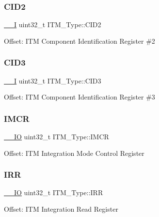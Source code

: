 \subsubsection{\texorpdfstring{CID2}{CID2}}
{\footnotesize\ttfamily \mbox{\hyperlink{group___c_m_s_i_s___c_m3__core__definitions_gaf63697ed9952cc71e1225efe205f6cd3}{\+\_\+\+\_\+I}} uint32\+\_\+t I\+T\+M\+\_\+\+Type\+::\+C\+I\+D2}

Offset\+: I\+TM Component Identification Register \#2 \mbox{\label{struct_i_t_m___type_a0e7aa199619cc7ac6baddff9600aa52e}} 
\subsubsection{\texorpdfstring{CID3}{CID3}}
{\footnotesize\ttfamily \mbox{\hyperlink{group___c_m_s_i_s___c_m3__core__definitions_gaf63697ed9952cc71e1225efe205f6cd3}{\+\_\+\+\_\+I}} uint32\+\_\+t I\+T\+M\+\_\+\+Type\+::\+C\+I\+D3}

Offset\+: I\+TM Component Identification Register \#3 \mbox{\label{struct_i_t_m___type_ab2e87d8bb0e3ce9b8e0e4a6a6695228a}} 
\subsubsection{\texorpdfstring{IMCR}{IMCR}}
{\footnotesize\ttfamily \mbox{\hyperlink{group___c_m_s_i_s___c_m3__core__definitions_gaec43007d9998a0a0e01faede4133d6be}{\+\_\+\+\_\+\+IO}} uint32\+\_\+t I\+T\+M\+\_\+\+Type\+::\+I\+M\+CR}

Offset\+: I\+TM Integration Mode Control Register ~\newline
 \mbox{\label{struct_i_t_m___type_ae43a66174b8ab182ff595e5f5da9f235}} 
\subsubsection{\texorpdfstring{IRR}{IRR}}
{\footnotesize\ttfamily \mbox{\hyperlink{group___c_m_s_i_s___c_m3__core__definitions_gaec43007d9998a0a0e01faede4133d6be}{\+\_\+\+\_\+\+IO}} uint32\+\_\+t I\+T\+M\+\_\+\+Type\+::\+I\+RR}

Offset\+: I\+TM Integration Read Register ~\newline
 \mbox{\label{struct_i_t_m___type_af53499fc94cda629afb2fec858d2ad1c}} 
